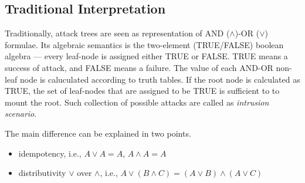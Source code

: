 \subsection{Traditional Interpretation}

Traditionally, attack trees are seen as representation of AND ($\wedge$)-OR ($\vee$) formulae. 
Its algebraic semantics is the two-element (TRUE/FALSE) boolean algebra --- every leaf-node is assigned either TRUE or FALSE. TRUE means a success of attack, and FALSE means a failure. The value of each AND-OR non-leaf node is caluculated according to truth tables. If the root node is calculated as TRUE,  the set of leaf-nodes that are assigned to be TRUE is sufficient to to mount the root. Such collection of possible attacks are called as  {\it intrusion scenario}. 

The main difference can be explained in two points.

\begin{itemize}
\item idempotency, i.e., $A \vee A = A$,  $A \wedge A = A$
\item distributivity $\vee$ over $\wedge$, i.e.,  $A \vee ( B \wedge C) =  (A \vee B) \wedge (A \vee C) $
\end{itemize}

\def\fCenter{\LLvdash}

